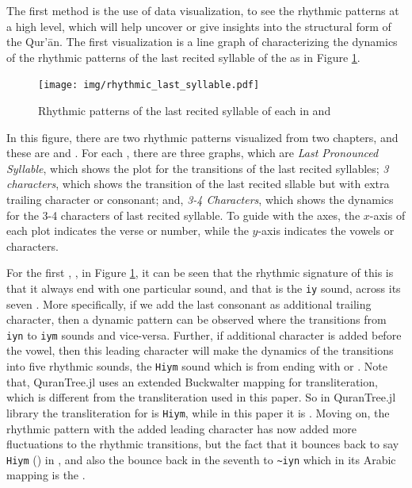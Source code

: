 The first method is the use of data visualization, to see the rhythmic patterns at a high level, which will help uncover or give insights into the structural form of the Qur'\=an. The first visualization is a line graph of characterizing the dynamics of the rhythmic patterns of the last recited syllable of the   as in Figure \ref{fig:result_last_syllable_rhythmic}.

\begin{figure}[!t]
    \centering
    \texttt{[image: img/rhythmic\_last\_syllable.pdf]}
    \caption{Rhythmic patterns of the last recited syllable of each   in   and  }
    \label{fig:result_last_syllable_rhythmic}
\end{figure}

In this figure, there are two rhythmic patterns visualized from two chapters, and these are   and  . For each  , there are three graphs, which are \textit{Last Pronounced Syllable}, which shows the plot for the transitions of the last recited syllables; \textit{3 characters}, which shows the transition of the last recited sllable but with extra trailing character or consonant; and, \textit{3-4 Characters}, which shows the dynamics for the 3-4 characters of last recited syllable. To guide with the axes, the $x$-axis of each plot indicates the verse or   number, while the $y$-axis indicates the vowels or characters.

For the first  ,  , in Figure \ref{fig:result_last_syllable_rhythmic}, it can be seen that the rhythmic signature of this   is that it always end with one particular sound, and that is the \texttt{iy} sound, across its seven  . More specifically, if we add the last consonant as additional trailing character, then a dynamic pattern can be observed where the   transitions from \texttt{iyn} to \texttt{iym} sounds and vice-versa. Further, if additional character is added before the vowel, then this leading character will make the dynamics of the transitions into five rhythmic sounds, the \texttt{Hiym} sound which is from   ending with  or . Note that, QuranTree.jl \cite{asaad2021qurantree} uses an extended Buckwalter mapping for transliteration, which is different from the transliteration used in this paper. So in QuranTree.jl library the transliteration for  is \texttt{Hiym}, while in this paper it is . Moving on, the rhythmic pattern with the added leading character has now added more fluctuations to the rhythmic transitions, but the fact that it bounces back to say \texttt{Hiym} () in  , and also the bounce back in the seventh   to \verb|~iyn| which in its Arabic mapping is the  . 

